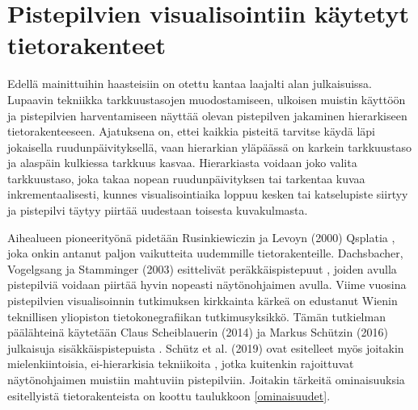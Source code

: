 \section{Pistepilvien visualisointiin käytetyt tietorakenteet}\label{kirjallisuus}

Edellä mainittuihin haasteisiin on otettu kantaa laajalti alan julkaisuissa. Lupaavin tekniikka tarkkuustasojen muodostamiseen, ulkoisen muistin käyttöön ja pistepilvien harventamiseen näyttää olevan pistepilven jakaminen hierarkiseen tietorakenteeseen. Ajatuksena on, ettei kaikkia pisteitä tarvitse käydä läpi jokaisella ruudunpäivityksellä, vaan hierarkian yläpäässä on karkein tarkkuustaso ja alaspäin kulkiessa tarkkuus kasvaa. Hierarkiasta voidaan joko valita tarkkuustaso, joka takaa nopean ruudunpäivityksen tai tarkentaa kuvaa inkrementaalisesti, kunnes visualisointiaika loppuu kesken tai katselupiste siirtyy ja pistepilvi täytyy piirtää uudestaan toisesta kuvakulmasta. 

Aihealueen pioneerityönä pidetään Rusinkiewiczin ja Levoyn (2000) Qsplatia \cite{qsplat}, joka onkin antanut paljon vaikutteita uudemmille tietorakenteille. Dachsbacher, Vogelgsang ja Stamminger (2003) esittelivät peräkkäispistepuut \cite{spt}, joiden avulla pistepilviä voidaan piirtää hyvin nopeasti näytönohjaimen avulla. Viime vuosina pistepilvien visualisoinnin tutkimuksen kirkkainta kärkeä on edustanut Wienin teknillisen yliopiston tietokonegrafiikan tutkimusyksikkö. Tämän tutkielman päälähteinä käytetään Claus Scheiblauerin (2014) ja Markus Schützin (2016) julkaisuja sisäkkäispistepuista \cite{scheiblauer}\cite{potree}. Schütz et al. (2019) ovat esitelleet myös joitakin mielenkiintoisia, ei-hierarkisia tekniikoita \cite{clod}\cite{progressive}, jotka kuitenkin rajoittuvat näytönohjaimen muistiin mahtuviin pistepilviin. Joitakin tärkeitä ominaisuuksia esitellyistä tietorakenteista on koottu taulukkoon \ref{ominaisuudet}.

